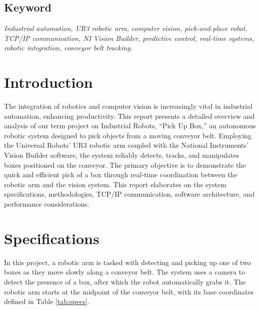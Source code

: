 \documentclass[a4paper, 10pt]{article}
\begin{document}
\begin{titlepage}
    \begin{center}
        \item\section*{Keyword}
    \end{center}
    \textit{Industrial automation, UR3 robotic arm, computer vision, pick-and-place robot, TCP/IP communication, NI Vision Builder, predictive control, real-time systems, robotic integration, conveyor belt tracking.}


    
\end{titlepage}
\newpage
\tableofcontents

\newpage
\section{Introduction}
The integration of robotics and computer vision is increasingly vital in industrial automation, enhancing productivity. This report presents a detailed overview and analysis of our term project on Industrial Robots, “Pick Up Box,” an autonomous robotic system designed to pick objects from a moving conveyor belt. Employing the Universal Robots’ UR3 robotic arm coupled with the National Instruments’ Vision Builder software, the system reliably detects, tracks, and manipulates boxes positioned on the conveyor. The primary objective is to demonstrate the quick and efficient pick of a box through real-time coordination between the robotic arm and the vision system. This report elaborates on the system specifications, methodologies, TCP/IP communication, software architecture, and performance considerations.
\section{Specifications}
In this project, a robotic arm is tasked with detecting and picking up one of two boxes as they move slowly along a conveyor belt. The system uses a camera to detect the presence of a box, after which the robot automatically grabs it. The robotic arm starts at the midpoint of the conveyor belt, with its base coordinates defined in Table \ref{tab:specs}.
\end{document}
